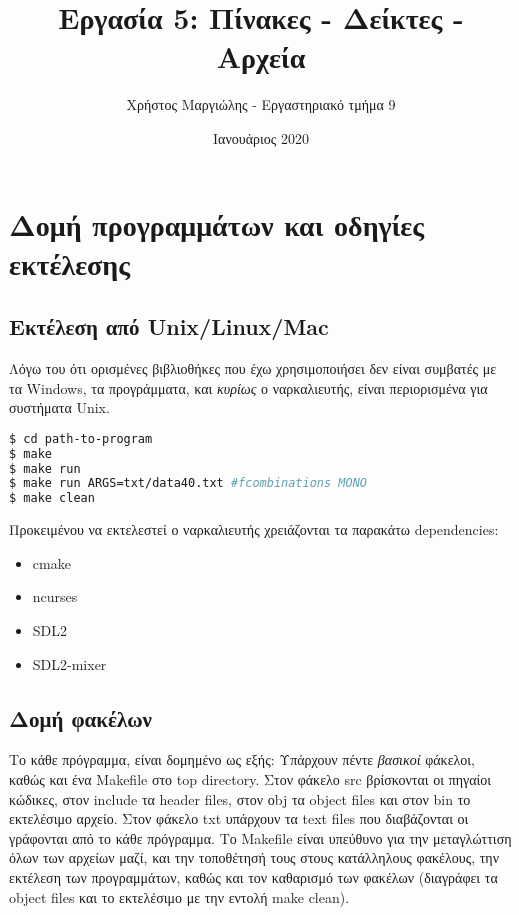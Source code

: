 \documentclass{article}
\title{Εργασία 5: Πίνακες - Δείκτες - Αρχεία}
\author{Χρήστος Μαργιώλης - Εργαστηριακό τμήμα 9}
\date{Ιανουάριος 2020}
\begin{document}
\begin{titlepage}
    \maketitle
\end{titlepage}

\renewcommand{\contentsname}{Περιεχόμενα}
\tableofcontents

\section{Δομή προγραμμάτων και οδηγίες εκτέλεσης}

    \subsection{Εκτέλεση από Unix/Linux/Mac}

    Λόγω του ότι ορισμένες βιβλιοθήκες που έχω χρησιμοποιήσει δεν είναι συμβατές με τα Windows, τα προγράμματα,
    και \textit{κυρίως} ο ναρκαλιευτής, είναι περιορισμένα για συστήματα Unix.

\begin{lstlisting}[language=bash]
$ cd path-to-program
$ make
$ make run
$ make run ARGS=txt/data40.txt #fcombinations MONO
$ make clean
\end{lstlisting}
    
    Προκειμένου να εκτελεστεί ο ναρκαλιευτής χρειάζονται τα παρακάτω dependencies:  
    \begin{itemize}
        \item cmake
        \item ncurses
        \item SDL2
        \item SDL2-mixer
    \end{itemize}

    \subsection{Δομή φακέλων}

    Το κάθε πρόγραμμα, είναι δομημένο ως εξής: Υπάρχουν πέντε \textit{βασικοί} φάκελοι, καθώς και ένα Makefile
    στο top directory. Στον φάκελο src βρίσκονται οι πηγαίοι κώδικες, στον include τα header
    files, στον οbj τα object files και στον bin το εκτελέσιμο αρχείο. Στον φάκελο txt
    υπάρχουν τα text files που διαβάζονται οι γράφονται από το κάθε πρόγραμμα.
    Το Makefile είναι υπεύθυνο για την μεταγλώττιση όλων των αρχείων μαζί, και την τοποθέτησή
    τους στους κατάλληλους φακέλους, την εκτέλεση των προγραμμάτων, καθώς και τον καθαρισμό των
    φακέλων (διαγράφει τα object files και το εκτελέσιμο με την εντολή make clean).
\end{document}
